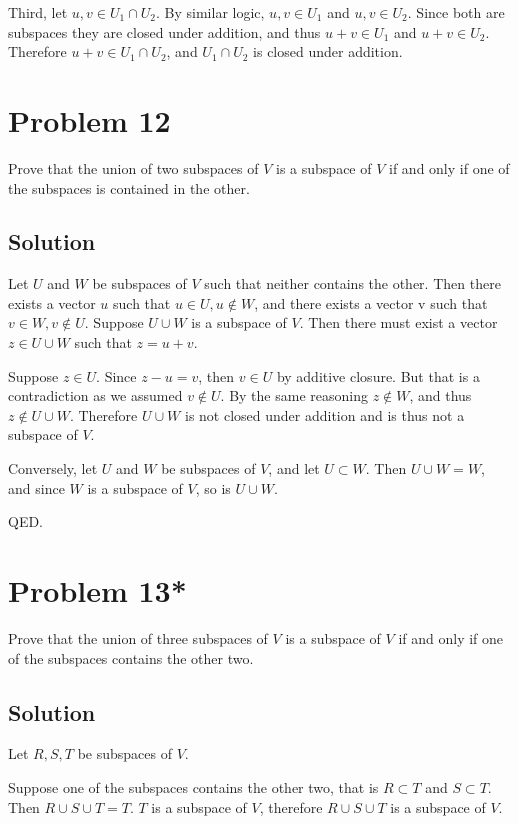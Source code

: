 \documentclass{article}
\begin{document}
\vs

Third, let $u, v\in U_1\cap U_2$. By similar logic, $u,v\in U_1$ and $u,v\in U_2$. Since both are subspaces they are closed under addition, and thus $u+v\in U_1$ and $u+v\in U_2$. Therefore $u+v \in U_1\cap U_2$, and $U_1\cap U_2$ is closed under addition.

\section*{Problem 12}
Prove that the union of two subspaces of $V$ is a subspace of $V$ if and only if one of the subspaces is contained in the other.

\subsection*{Solution}

Let $U$ and $W$ be subspaces of $V$ such that neither contains the other. Then there exists a vector $u$ such that $u\in U, u\notin W$, and there exists a vector v such that $v\in W, v\notin U$.  Suppose $U\cup W$ is a subspace of $V$. Then there must exist a vector $z\in U\cup W$ such that $z=u+v$.

\vs

Suppose $z\in U$. Since $z-u=v$, then $v\in U$ by additive closure. But that is a contradiction as we assumed $v\notin U$. By the same reasoning $z\notin W$, and thus $z\notin U\cup W$. Therefore $U\cup W$ is not closed under addition and is thus not a subspace of $V$.

\vs

Conversely, let $U$ and $W$ be subspaces of $V$, and let $U\subset W$. Then $U\cup W=W$, and since $W$ is a subspace of $V$, so is $U\cup W$.

\vs

QED.

\section*{Problem 13*}
Prove that the union of three subspaces of $V$ is a subspace of $V$ if and only if one of the subspaces contains the other two.

\subsection*{Solution}
Let $R, S, T$ be subspaces of $V$.

\vs

Suppose one of the subspaces contains the other two, that is $R\subset T$ and $S\subset T$. Then $R\cup S\cup T=T$. $T$ is a subspace of $V$, therefore $R\cup S\cup T$ is a subspace of $V$.
\end{document}
